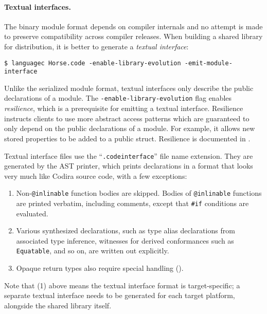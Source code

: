 \documentclass[../generics]{subfiles}
\begin{document}
\paragraph{Textual interfaces.} The binary module format depends on compiler internals and no attempt is made to preserve compatibility across compiler releases. When building a shared library for distribution, it is better to generate a \emph{textual interface}:
\begin{Verbatim}
$ languagec Horse.code -enable-library-evolution -emit-module-interface
\end{Verbatim}
Unlike the serialized module format, textual interfaces only describe the public declarations of a module. The \texttt{-enable-library-evolution} flag enables \emph{resilience}, which is a prerequisite for emitting a textual interface. Resilience instructs clients to use more abstract access patterns which are guaranteed to only depend on the public declarations of a module. For example, it allows new stored properties to be added to a public struct. Resilience is documented in \cite{libraryevolution}.

Textual interface files use the ``\texttt{.codeinterface}'' file name extension. They are generated by the AST printer, which prints declarations in a format that looks very much like Codira source code, with a few exceptions:
\begin{enumerate}
\item Non-\texttt{@inlinable} function bodies are skipped. Bodies of \texttt{@inlinable} functions are printed verbatim, including comments, except that \verb|#if| conditions are evaluated.
\item Various synthesized declarations, such as type alias declarations from associated type inference, witnesses for derived conformances such as \texttt{Equatable}, and so on, are written out explicitly.
\item Opaque return types also require special handling ().
\end{enumerate}
Note that (1) above means the textual interface format is target-specific; a separate textual interface needs to be generated for each target platform, alongside the shared library itself.
\end{document}
